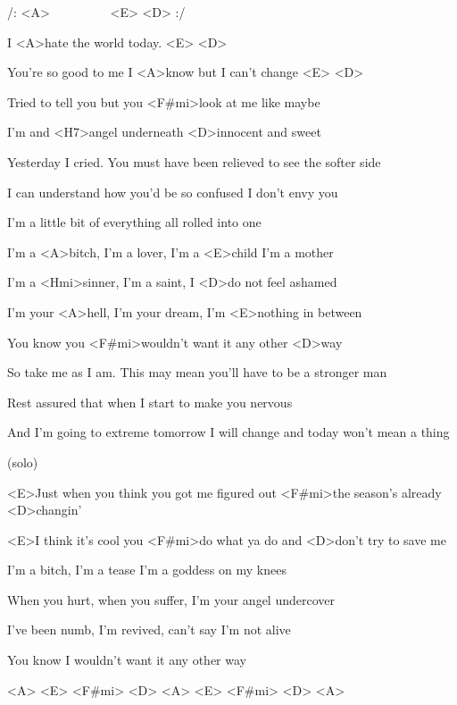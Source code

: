 
/: <A>~~~~~~~~~ <E> <D> :/

\zs
I <A>hate the world today. <E> <D>

You're so good to me I <A>know but I can't change <E> <D>

Tried to tell you but you <F#mi>look at me like maybe

I'm and <H7>angel underneath <D>innocent and sweet
 \ks

\zs
Yesterday I cried. You must have been relieved to see the softer side

I can understand how you'd be so confused I don't envy you

I'm a little bit of everything all rolled into one
\ks

\zr
I'm a <A>bitch, I'm a lover, I'm a <E>child I'm a mother

I'm a <Hmi>sinner, I'm a saint, I <D>do not feel ashamed

I'm your <A>hell, I'm your dream, I'm <E>nothing in between

You know you <F#mi>wouldn't want it any other <D>way
\kr

\zs
So take me as I am. This may mean you'll have to be a stronger man

Rest assured that when I start to make you nervous

And I'm going to extreme tomorrow I will change and today won't mean a thing
\ks

\zr

\kr

\zr (solo) \kr

<E>Just when you think you got me figured out <F#mi>the season's 
already <D>changin'

<E>I think it's cool you <F#mi>do what ya do and <D>don't try 
to save me

\zr
\kr

\zr
I'm a bitch, I'm a tease I'm a goddess on my knees

When you hurt, when you suffer, I'm your angel undercover

I've been numb, I'm revived, can't say I'm not alive

You know I wouldn't want it any other way
\kr

<A> <E> <F#mi> <D> 
<A> <E> <F#mi> <D> 
<A>

\kp
